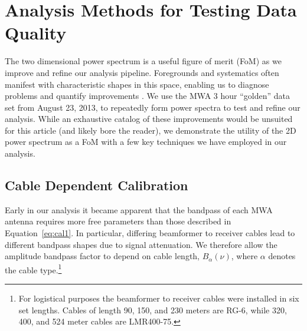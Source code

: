 \documentclass[iop]{emulateapj}
\begin{document}
\section{Analysis Methods for Testing Data Quality}\label{sec:techniques}

The two dimensional power spectrum is a useful figure of merit (FoM) as we improve and 
refine our analysis pipeline. Foregrounds and systematics often manifest with characteristic 
shapes in this space, enabling us to diagnose problems and quantify improvements 
\citep{Morales:2012}. We use the MWA 3 hour ``golden'' data set from August 23, 2013, to 
repeatedly form power spectra to test and refine our analysis. While an exhaustive catalog 
of these improvements would be unsuited for this article (and likely bore the reader), we 
demonstrate the utility of the 2D power spectrum as a FoM with a few key techniques we 
have employed in our analysis. 

\subsection{Cable Dependent Calibration}\label{sec:cables}

Early in our analysis it became apparent that the bandpass of each MWA antenna requires 
more free parameters than those described in Equation~\ref{eq:cal1}. In particular, differing 
beamformer to receiver cables lead to different bandpass shapes due to signal attenuation. 
We therefore allow the amplitude bandpass factor to depend on cable length, $B_{\alpha}
(\nu)$, where $\alpha$ denotes the cable type.\footnote{For logistical purposes the 
beamformer to receiver cables were installed in six set lengths. Cables of length 90, 150, 
and 230 meters are RG-6, while 320, 400, and 524 meter cables are LMR400-75.}
\end{document}
